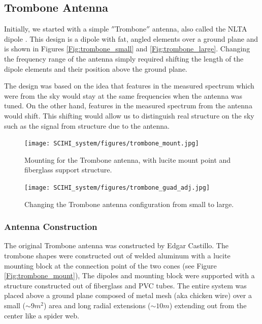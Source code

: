 \subsection{Trombone Antenna}
Initially, we started with a simple $''$Trombone$''$ antenna, also called the NLTA dipole \cite{ellingson_2005}. This design is a dipole with fat, angled elements over a ground plane and is shown in Figures \ref{Fig:trombone_small} and \ref{Fig:trombone_large}. Changing the frequency range of the antenna simply required shifting the length of the dipole elements and their position above the ground plane. 

The design was based on the idea that features in the measured spectrum which were from the sky would stay at the same frequencies when the antenna was tuned. On the other hand, features in the measured spectrum from the antenna would shift. This shifting would allow us to distinguish real structure on the sky such as the \cm signal from structure due to the antenna. 

\begin{figure}[htb]
\centering
\begin{minipage}[b]{0.53\textwidth}
\centering
\texttt{[image: SCIHI\_system/figures/trombone\_mount.jpg]}
\caption{Mounting for the Trombone antenna, with lucite mount point and fiberglass support structure. }
\label{Fig:trombone_mount}
\end{minipage}%
\begin{minipage}[b]{0.02\textwidth}
\hspace{1cm}
\end{minipage}%
\begin{minipage}[b]{0.41\textwidth}
\centering
\texttt{[image: SCIHI\_system/figures/trombone\_guad\_adj.jpg]}
\caption{Changing the Trombone antenna configuration from small to large.}
\label{Fig:trombone_adj}
\end{minipage}
\end{figure}

\subsubsection{Antenna Construction}
The original Trombone antenna was constructed by Edgar Castillo. The trombone shapes were constructed out of welded aluminum with a lucite mounting block at the connection point of the two cones (see Figure \ref{Fig:trombone_mount}), The dipoles and mounting block were supported with a structure constructed out of fiberglass and PVC tubes. The entire system was placed above a ground plane composed of metal mesh (aka chicken wire) over a small ($\sim9 m^2$) area and long radial extensions ($\sim10 m$) extending out from the center like a spider web. 

